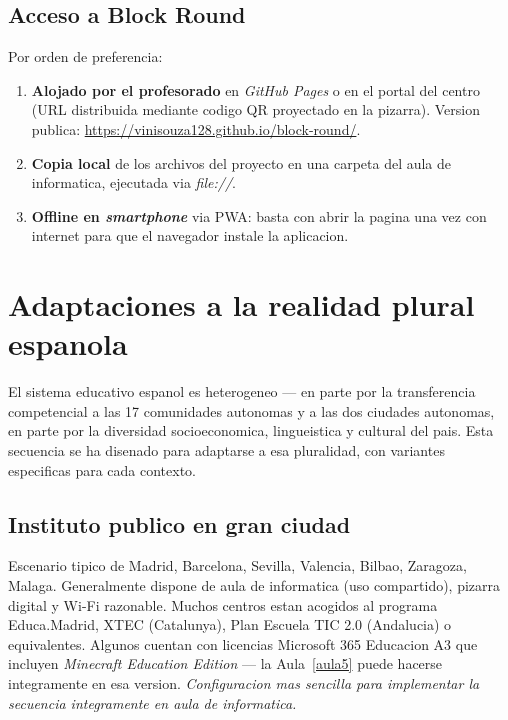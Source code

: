 \documentclass[12pt,a4paper]{scrartcl}
\begin{document}
\subsection{Acceso a Block Round}

Por orden de preferencia:

\begin{enumerate}[leftmargin=1.5em,itemsep=0.15em,topsep=0.3em]
  \item \textbf{Alojado por el profesorado} en \emph{GitHub Pages} o en el portal del centro (URL distribuida mediante codigo QR proyectado en la pizarra). Version publica: \url{https://vinisouza128.github.io/block-round/}.
  \item \textbf{Copia local} de los archivos del proyecto en una carpeta del aula de informatica, ejecutada via \emph{file://}.
  \item \textbf{Offline en \emph{smartphone}} via PWA: basta con abrir la pagina una vez con internet para que el navegador instale la aplicacion.
\end{enumerate}

\section{Adaptaciones a la realidad plural espanola}\label{sec:adapt}

El sistema educativo espanol es heterogeneo --- en parte por la transferencia competencial a las 17 comunidades autonomas y a las dos ciudades autonomas, en parte por la diversidad socioeconomica, lingueistica y cultural del pais. Esta secuencia se ha disenado para adaptarse a esa pluralidad, con variantes especificas para cada contexto.

\subsection{Instituto publico en gran ciudad}
Escenario tipico de Madrid, Barcelona, Sevilla, Valencia, Bilbao, Zaragoza, Malaga. Generalmente dispone de aula de informatica (uso compartido), pizarra digital y Wi-Fi razonable. Muchos centros estan acogidos al programa Educa.Madrid, XTEC (Catalunya), Plan Escuela TIC 2.0 (Andalucia) o equivalentes. Algunos cuentan con licencias Microsoft 365 Educacion A3 que incluyen \emph{Minecraft Education Edition} --- la Aula~\ref{aula5} puede hacerse integramente en esa version. \emph{Configuracion mas sencilla para implementar la secuencia integramente en aula de informatica.}
\end{document}
